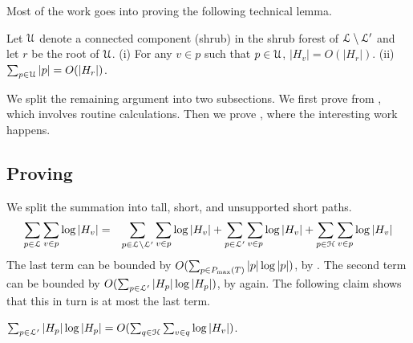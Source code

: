 {Most of the work goes into proving the following technical lemma.

\begin{lemma} \label{lem:cu-root} Let ${\cal U}$ denote a connected component (shrub) in the shrub forest of ${\cal L} \setminus {\cal L}'$ and let $r$
be the root of ${\cal U}$. (i) For any $v \in p$ such that $p \in {\cal U}$,
$|H_v| = O(|H_r|)$. (ii) $\sum_{p \in {\cal U}} |p| = O(|H_r|)$.
\end{lemma}

We split the remaining argument into two subsections. We first prove  from ,
which involves routine calculations. Then we prove , where the interesting work happens.


\subsection{Proving } \label{sec:thm-runtime}

We split the summation into tall, short, and unsupported short paths.
\begin{eqnarray*} 
\sum_{p \in {\cal L}} \sum_{v \in p} \log |H_v| & = & \sum_{p \in {\cal L} \setminus {\cal L}'} \sum_{v \in p} \log |H_v| + \sum_{p \in {\cal L}'} \sum_{v \in p} \log |H_v| + \sum_{p \in {\cal H}} \sum_{v \in p} \log |H_v|
\end{eqnarray*}
The last term can be bounded by $O(\sum_{p \in P_{\max}(T)} |p|\log |p|)$, by .
The second term can be bounded by $O(\sum_{p \in {\cal L}'} |H_p| \log |H_p|)$, by  again.
The following claim shows that this in turn is at most the last term.


\begin{claim} \label{clm:above} $\sum_{p \in {\cal L}'} |H_p| \log |H_p| = O(\sum_{q \in {\cal H}} \sum_{v \in q} \log |H_v|)$.
\end{claim}

}
